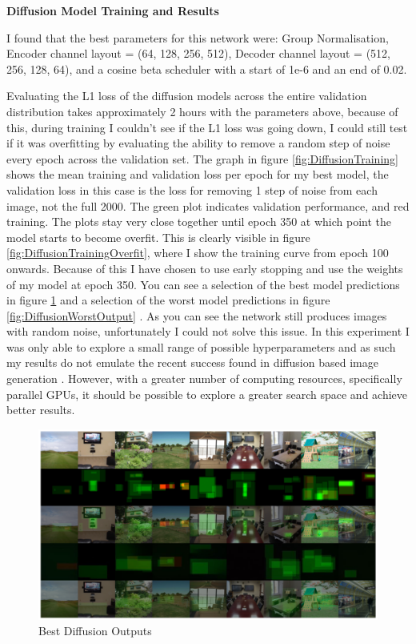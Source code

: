 \documentclass{UoYCSproject}
\begin{document}
\textbf{Diffusion Model Training and Results}

I found that the best parameters for this network were: Group Normalisation, Encoder channel layout = (64, 128, 256, 512), Decoder channel layout = (512, 256, 128, 64), and a cosine beta scheduler with a start of 1e-6 and an end of 0.02.

Evaluating the L1 loss of the diffusion models across the entire validation distribution takes approximately 2 hours with the parameters above, because of this, during training I couldn't see if the L1 loss was going down, I could still test if it was overfitting by evaluating the ability to remove a random step of noise every epoch across the validation set. The graph in figure 
\ref{fig:DiffusionTraining}
shows the mean training and validation loss per epoch for my best model, the validation loss in this case is the loss for removing 1 step of noise from each image, not the full 2000. The green plot indicates validation performance, and red training. The plots stay very close together until epoch 350 at which point the model starts to become overfit. This is clearly visible in figure \ref{fig:DiffusionTrainingOverfit}, where I show the training curve from epoch 100 onwards. Because of this I have chosen to use early stopping and use the weights of my model at epoch 350.
You can see a selection of the best model predictions in figure 
\ref{fig:DiffusionBestOutputs}
and a selection of the worst model predictions in figure 
\ref{fig:DiffusionWorstOutput}
. As you can see the network still produces images with random noise, unfortunately I could not solve this issue. In this experiment I was only able to explore a small range of possible hyperparameters and as such my results do not emulate the recent success found in diffusion based image generation \cite{ramesh2022hierarchical, saharia2022photorealistic}. However, with a greater number of computing resources, specifically parallel GPUs, it should be possible to explore a greater search space and achieve better results.

\begin{figure}[ht]
    \centering
    \includegraphics[width=\linewidth]{Diffusion Best Outputs}
    \caption{Best Diffusion Outputs}
    \label{fig:DiffusionBestOutputs}
\end{figure}
\end{document}
